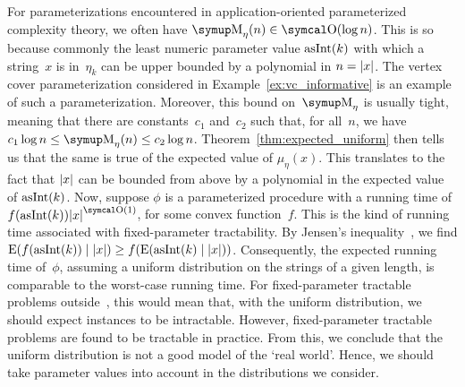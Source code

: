 For parameterizations encountered in application-oriented parameterized complexity theory, we often have $\upM_\eta(n) \in \bigO(\log n)$.
This is so because commonly the least numeric parameter value $\operatorname{asInt}(k)$ with which a string~$x$ is in~$\eta_k$ can be upper bounded by a polynomial in $n = {\lvert x\rvert}$.
The vertex cover parameterization considered in Example~\ref{ex:vc_informative} is an example of such a parameterization.
Moreover, this bound on~$\upM_\eta$ is usually tight, meaning that there are constants~$c_1$ and~$c_2$ such that, for all~$n$, we have $c_1 \log n \le \upM_\eta(n) \le c_2 \log n$.
Theorem~\ref{thm:expected_uniform} then tells us that the same is true of the expected value of $\mu_\eta(x)$.
This translates to the fact that ${\lvert x\rvert}$ can be bounded from above by a polynomial in the expected value of $\operatorname{asInt}(k)$.
Now, suppose $\phi$ is a parameterized procedure with a running time of $f(\asNat(k))\length{x}^{\bigO(1)}$, for some convex function~$f$.
This is the kind of running time associated with fixed-parameter tractability.
By Jensen's inequality~\parencite{cover2006elements}, we find $\operatorname*{E}(f(\operatorname{asInt}(k)) \mid {\lvert x\rvert}) \ge f(\operatorname*{E}(\operatorname{asInt}(k) \mid {\lvert x\rvert}))$.
Consequently, the expected running time of~$\phi$, assuming a uniform distribution on the strings of a given length, is comparable to the worst-case running time.
For fixed-parameter tractable problems outside~, this would mean that, with the uniform distribution, we should expect instances to be intractable.
However, fixed-parameter tractable problems are found to be tractable in practice.
From this, we conclude that the uniform distribution is not a good model of the \enquote*{real world}.
Hence, we should take parameter values into account in the distributions we consider.

